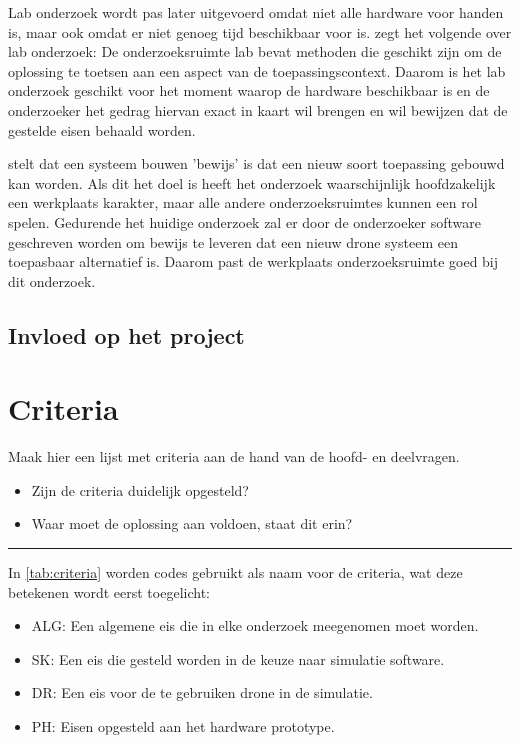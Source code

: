 \documentclass[a4paper, 11pt, oneside]{report}
\begin{document}
Lab onderzoek wordt pas later uitgevoerd omdat niet alle hardware voor handen is, maar ook omdat er niet genoeg tijd beschikbaar voor is.
\citeauthor{MethodenKaart} zegt het volgende over lab onderzoek: De onderzoeksruimte lab bevat methoden die geschikt zijn om de oplossing te toetsen aan een aspect van de toepassingscontext.
Daarom is het lab onderzoek geschikt voor het moment waarop de hardware beschikbaar is en de onderzoeker het gedrag hiervan exact in kaart wil brengen en wil bewijzen dat de gestelde eisen behaald worden.

 stelt dat een systeem bouwen 'bewijs' is dat een nieuw soort toepassing gebouwd kan worden. Als dit het doel is heeft het onderzoek waarschijnlijk hoofdzakelijk een werkplaats karakter, maar alle andere onderzoeksruimtes kunnen een rol spelen.
Gedurende het huidige onderzoek zal er door de onderzoeker software geschreven worden om bewijs te leveren dat een nieuw drone systeem een toepasbaar alternatief is.
Daarom past de werkplaats onderzoeksruimte goed bij dit onderzoek.


\section{Invloed op het project}



\chapter{Criteria}
\label{chapter:criteria}
Maak hier een lijst met criteria aan de hand van de hoofd- en deelvragen.
\begin{itemize}	
\item Zijn de criteria duidelijk opgesteld?
\item Waar moet de oplossing aan voldoen, staat dit erin?
\end{itemize}
\hrule

In \autoref{tab:criteria} worden codes gebruikt als naam voor de criteria, wat deze betekenen wordt eerst toegelicht:
\begin{itemize}
	\item ALG: Een algemene eis die in elke onderzoek meegenomen moet worden.
	\item SK: Een eis die gesteld worden in de keuze naar simulatie software.
	\item DR: Een eis voor de te gebruiken drone in de simulatie.
	\item PH: Eisen opgesteld aan het hardware prototype.
\end{itemize}
\end{document}
